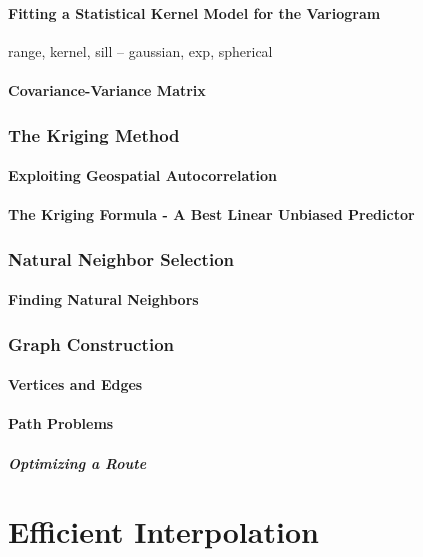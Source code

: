 \documentclass[11pt]{ucthesis}
\begin{document}
\subsection{Fitting a Statistical Kernel Model for the Variogram}
range, kernel, sill -- gaussian, exp, spherical
\subsection{Covariance-Variance Matrix}

\section{The Kriging Method}
\subsection{Exploiting Geospatial Autocorrelation}
\subsection{The Kriging Formula - A Best Linear Unbiased Predictor}

\section{Natural Neighbor Selection}
\subsection{Finding Natural Neighbors}

\section{Graph Construction}
\subsection{Vertices and Edges}
\subsection{Path Problems}
\subsubsection{Optimizing a Route}

\part{Efficient Interpolation}
\end{document}
